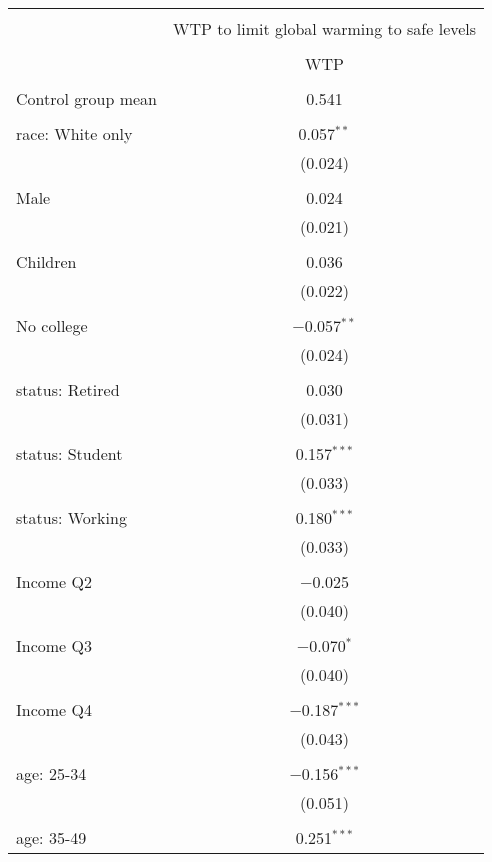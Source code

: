 
\begin{tabular}{@{\extracolsep{5pt}}lc} 
\\[-1.8ex]\hline 
\hline \\[-1.8ex] 
 & \multicolumn{1}{c}{WTP to limit global warming to safe levels} \\ 
\cline{2-2} 
\\[-1.8ex] & WTP \\ 
\hline \\[-1.8ex] 
 Control group mean & 0.541  \\ \hline \\[-1.8ex] race: White only & 0.057$^{**}$ \\ 
  & (0.024) \\ 
  & \\ 
 Male & 0.024 \\ 
  & (0.021) \\ 
  & \\ 
 Children & 0.036 \\ 
  & (0.022) \\ 
  & \\ 
 No college & $-$0.057$^{**}$ \\ 
  & (0.024) \\ 
  & \\ 
 status: Retired & 0.030 \\ 
  & (0.031) \\ 
  & \\ 
 status: Student & 0.157$^{***}$ \\ 
  & (0.033) \\ 
  & \\ 
 status: Working & 0.180$^{***}$ \\ 
  & (0.033) \\ 
  & \\ 
 Income Q2 & $-$0.025 \\ 
  & (0.040) \\ 
  & \\ 
 Income Q3 & $-$0.070$^{*}$ \\ 
  & (0.040) \\ 
  & \\ 
 Income Q4 & $-$0.187$^{***}$ \\ 
  & (0.043) \\ 
  & \\ 
 age: 25-34 & $-$0.156$^{***}$ \\ 
  & (0.051) \\ 
  & \\ 
 age: 35-49 & 0.251$^{***}$ \\ 

\end{tabular}
